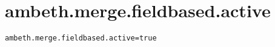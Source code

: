 \section{ambeth.merge.fieldbased.active}
\label{configuration:AmbethMergeFieldbasedActive}
\ClearAPI
\TODO
{}
\begin{lstlisting}[style=Props,caption={Usage example for \textit{ambeth.merge.fieldbased.active}}]
ambeth.merge.fieldbased.active=true
\end{lstlisting}